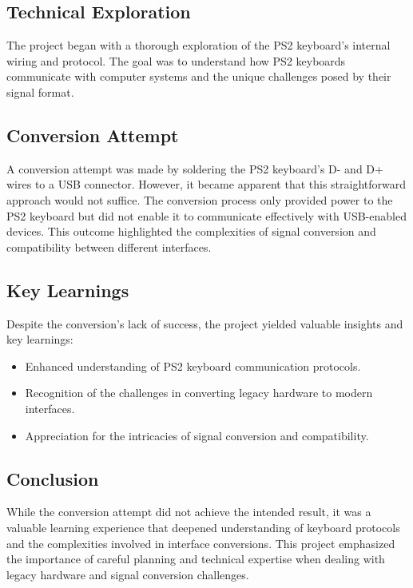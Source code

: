 \subsection{Technical Exploration}

The project began with a thorough exploration of the PS2 keyboard's internal wiring and protocol. The goal was to understand how PS2 keyboards communicate with computer systems and the unique challenges posed by their signal format.

\subsection{Conversion Attempt}

A conversion attempt was made by soldering the PS2 keyboard's D- and D+ wires to a USB connector. However, it became apparent that this straightforward approach would not suffice. The conversion process only provided power to the PS2 keyboard but did not enable it to communicate effectively with USB-enabled devices. This outcome highlighted the complexities of signal conversion and compatibility between different interfaces.

\subsection{Key Learnings}

Despite the conversion's lack of success, the project yielded valuable insights and key learnings:

\begin{itemize}
  \item Enhanced understanding of PS2 keyboard communication protocols.
  \item Recognition of the challenges in converting legacy hardware to modern interfaces.
  \item Appreciation for the intricacies of signal conversion and compatibility.
\end{itemize}

\subsection{Conclusion}

While the conversion attempt did not achieve the intended result, it was a valuable learning experience that deepened understanding of keyboard protocols and the complexities involved in interface conversions. This project emphasized the importance of careful planning and technical expertise when dealing with legacy hardware and signal conversion challenges.
